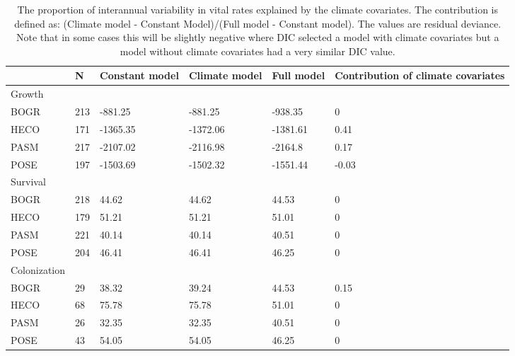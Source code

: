 \documentclass[12pt]{article}
\begin{document}
\begin{table}[ht]
\centering
\caption{The proportion of interannual variability in  vital rates explained by the climate covariates. The contribution is defined as: (Climate model - Constant Model)/(Full model - Constant model). The values are residual deviance. Note that in some cases this will be slightly negative where DIC selected a model with climate covariates but a model without climate covariates had a very similar DIC value.} 
\begin{tabularx}{\textwidth}{lllllX}
  \hline
 & N & Constant model & Climate model & Full model & Contribution of climate covariates \\ 
  \hline
Growth &  &  &  &  &  \\ 
  BOGR & 213 & -881.25 & -881.25 & -938.35 & 0 \\ 
  HECO & 171 & -1365.35 & -1372.06 & -1381.61 & 0.41 \\ 
  PASM & 217 & -2107.02 & -2116.98 & -2164.8 & 0.17 \\ 
  POSE & 197 & -1503.69 & -1502.32 & -1551.44 & -0.03 \\ 
  Survival &  &  &  &  &  \\ 
  BOGR & 218 & 44.62 & 44.62 & 44.53 & 0 \\ 
  HECO & 179 & 51.21 & 51.21 & 51.01 & 0 \\ 
  PASM & 221 & 40.14 & 40.14 & 40.51 & 0 \\ 
  POSE & 204 & 46.41 & 46.41 & 46.25 & 0 \\ 
  Colonization &  &  &  &  &  \\ 
  BOGR & 29 & 38.32 & 39.24 & 44.53 & 0.15 \\ 
  HECO & 68 & 75.78 & 75.78 & 51.01 & 0 \\ 
  PASM & 26 & 32.35 & 32.35 & 40.51 & 0 \\ 
  POSE & 43 & 54.05 & 54.05 & 46.25 & 0 \\ 
   \hline
\end{tabularx}
\end{table}
\end{document}

